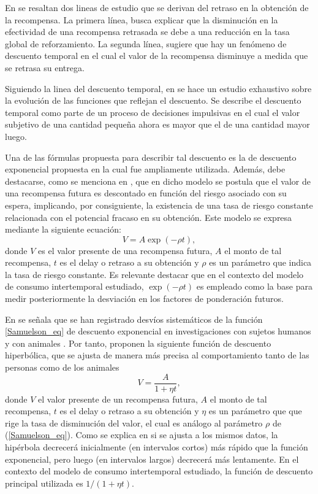 En \parencite{buritica2016valor} se resaltan dos lineas de estudio que se derivan del retraso en la obtención de la recompensa. La primera línea, busca explicar que la disminución en la efectividad de una recompensa retrasada se debe a una reducción en la tasa global de reforzamiento. La segunda línea, sugiere que hay un fenómeno de descuento temporal en el cual el valor de la recompensa disminuye a medida que se retrasa su entrega.

Siguiendo la linea del descuento temporal, en \parencite{madden2010delaydiscounting} se hace un estudio exhaustivo sobre la evolución de las funciones que reflejan el descuento. Se describe el descuento temporal como parte de un proceso de decisiones impulsivas en el cual el valor subjetivo de una cantidad pequeña ahora es mayor que el de una cantidad mayor luego. 

Una de las fórmulas propuesta para describir tal descuento es la de descuento exponencial propuesta en \parencite{Samuelson37} la cual fue ampliamente utilizada. 
Además, debe destacarse, como se menciona en \parencite{myerson1995discounting}, que en dicho modelo se postula que el valor de una recompensa futura es descontado en función del riesgo asociado con su espera, implicando, por consiguiente, la existencia de una tasa de riesgo constante relacionada con el potencial fracaso en su obtención. Este modelo se expresa mediante la siguiente ecuación:
%
\begin{equation}
\label{Samuelson_eq}
    V=A \exp(-\rho t),
\end{equation}
%
donde $V$ es el valor presente de una recompensa futura, $A$ el monto de tal recompensa, $t$ es el delay o retraso a su obtención y  $\rho$ es un parámetro que indica la tasa de riesgo constante. Es relevante destacar que en el contexto del modelo de consumo intertemporal estudiado, $\exp(-\rho t)$ es empleado como la base para medir posteriormente la desviación en los factores de ponderación futuros.

En \parencite{madden2010delaydiscounting} se señala que se han registrado desvíos sistemáticos de la función \ref{Samuelson_eq} de descuento exponencial en investigaciones con sujetos humanos \parencite{myerson1995discounting,kirby1997bidding} y con animales \parencite{mazur1997choice}. 
Por tanto, \parencite{ainslie1975specious,mazur1987adjusting} proponen la siguiente función de descuento hiperbólica, que se ajusta de manera más precisa al comportamiento tanto de las personas como de los animales
%
\begin{equation}
\label{hiperbolic_eq}
    V=\dfrac{A}{1+\eta t},
\end{equation}
%
donde $V$ el valor presente de un recompensa futura, $A$ el monto de tal recompensa, $t$ es el delay o retraso a su obtención y  $\eta$ es un parámetro que que rige la tasa de disminución del valor, el cual es análogo al parámetro $\rho$ de (\ref{Samuelson_eq}). Como se explica en \parencite{myerson1995discounting} si se ajusta a los mismos datos, la hipérbola decrecerá inicialmente (en intervalos cortos) más rápido que la función exponencial, pero luego (en intervalos largos) decrecerá más lentamente. En el contexto del modelo de consumo intertemporal estudiado, la función de descuento principal utilizada es ${1}/{(1+\eta t)}$.

